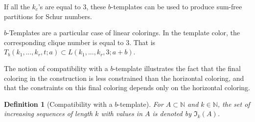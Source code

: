 \documentclass{article}
\newtheorem{definition}{Definition}[section]
\begin{document}
If all the \(k_c\)'s are equal to 3, these \(b\)-templates can be used to produce sum-free partitions for Schur numbers.

\(b\)-Templates are a particular case of linear colorings. In the template color, the corresponding clique number is 
equal to 3. That is \(T_b(k_1, ..., k_r, t; a) \subset L(k_1, ..., k_r, 3; a + b)\).

The notion of compatibility with a \(b\)-template illustrates the fact that the final coloring in the construction is 
less constrained than the horizontal coloring, and that the constraints on this final coloring depends only on the 
horizontal coloring.

\begin{definition}[Compatibility with a \(b\)-template]
For \(A \subset \mathbb{N}\) and \(k \in \mathbb{N}\), the set of increasing sequences of length \(k\) with values in 
\(A\) is denoted by \(\mathfrak{I}_k(A)\).


\end{definition}
\end{document}
